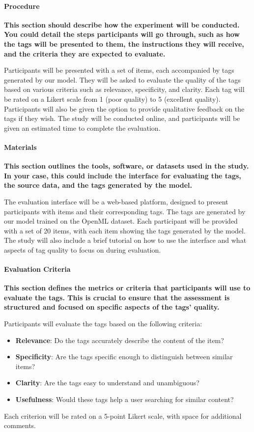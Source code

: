 \paragraph{Procedure}
\textbf{This section should describe how the experiment will be conducted. You could detail the steps participants will go through, such as how the tags will be presented to them, the instructions they will receive, and the criteria they are expected to evaluate.}

Participants will be presented with a set of items, each accompanied by tags generated by our model. They will be asked to evaluate the quality of the tags based on various criteria such as relevance, specificity, and clarity. Each tag will be rated on a Likert scale from 1 (poor quality) to 5 (excellent quality). Participants will also be given the option to provide qualitative feedback on the tags if they wish. The study will be conducted online, and participants will be given an estimated time to complete the evaluation.

\paragraph{Materials}
\textbf{This section outlines the tools, software, or datasets used in the study. In your case, this could include the interface for evaluating the tags, the source data, and the tags generated by the model.}

The evaluation interface will be a web-based platform, designed to present participants with items and their corresponding tags. The tags are generated by our model trained on the OpenML dataset. Each participant will be provided with a set of 20 items, with each item showing the tags generated by the model. The study will also include a brief tutorial on how to use the interface and what aspects of tag quality to focus on during evaluation.

\paragraph{Evaluation Criteria}
\textbf{This section defines the metrics or criteria that participants will use to evaluate the tags. This is crucial to ensure that the assessment is structured and focused on specific aspects of the tags' quality.}

Participants will evaluate the tags based on the following criteria:
\begin{itemize}
    \item \textbf{Relevance}: Do the tags accurately describe the content of the item?
    \item \textbf{Specificity}: Are the tags specific enough to distinguish between similar items?
    \item \textbf{Clarity}: Are the tags easy to understand and unambiguous?
    \item \textbf{Usefulness}: Would these tags help a user searching for similar content?
\end{itemize}
Each criterion will be rated on a 5-point Likert scale, with space for additional comments.

